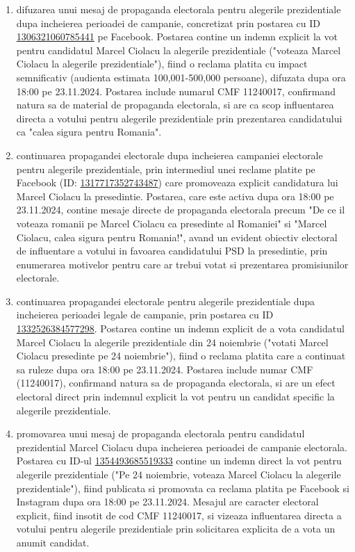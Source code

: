 \documentclass[a4paper,12pt]{article}
\begin{document}
\begin{enumerate}[leftmargin=*, label=\arabic*.)]
    \item difuzarea unui mesaj de propaganda electorala pentru alegerile prezidentiale dupa incheierea perioadei de campanie, concretizat prin postarea cu ID \href{https://www.facebook.com/ads/library/?id=1306321060785441}{1306321060785441} pe Facebook. Postarea contine un indemn explicit la vot pentru candidatul Marcel Ciolacu la alegerile prezidentiale ("voteaza Marcel Ciolacu la alegerile prezidentiale"), fiind o reclama platita cu impact semnificativ (audienta estimata 100,001-500,000 persoane), difuzata dupa ora 18:00 pe 23.11.2024. Postarea include numarul CMF 11240017, confirmand natura sa de material de propaganda electorala, si are ca scop influentarea directa a votului pentru alegerile prezidentiale prin prezentarea candidatului ca "calea sigura pentru Romania".
    \item continuarea propagandei electorale dupa incheierea campaniei electorale pentru alegerile prezidentiale, prin intermediul unei reclame platite pe Facebook (ID: \href{https://www.facebook.com/ads/library/?id=1317717352743487}{1317717352743487}) care promoveaza explicit candidatura lui Marcel Ciolacu la presedintie. Postarea, care este activa dupa ora 18:00 pe 23.11.2024, contine mesaje directe de propaganda electorala precum "De ce il voteaza romanii pe Marcel Ciolacu ca presedinte al Romaniei" si "Marcel Ciolacu, calea sigura pentru Romania!", avand un evident obiectiv electoral de influentare a votului in favoarea candidatului PSD la presedintie, prin enumerarea motivelor pentru care ar trebui votat si prezentarea promisiunilor electorale.
    \item continuarea propagandei electorale pentru alegerile prezidentiale dupa incheierea perioadei legale de campanie, prin postarea cu ID \href{https://www.facebook.com/ads/library/?id=1332526384577298}{1332526384577298}. Postarea contine un indemn explicit de a vota candidatul Marcel Ciolacu la alegerile prezidentiale din 24 noiembrie ("votati Marcel Ciolacu presedinte pe 24 noiembrie"), fiind o reclama platita care a continuat sa ruleze dupa ora 18:00 pe 23.11.2024. Postarea include numar CMF (11240017), confirmand natura sa de propaganda electorala, si are un efect electoral direct prin indemnul explicit la vot pentru un candidat specific la alegerile prezidentiale.
    \item promovarea unui mesaj de propaganda electorala pentru candidatul prezidential Marcel Ciolacu dupa incheierea perioadei de campanie electorala. Postarea cu ID-ul \href{https://www.facebook.com/ads/library/?id=1354493685519333}{1354493685519333} contine un indemn direct la vot pentru alegerile prezidentiale ("Pe 24 noiembrie, voteaza Marcel Ciolacu la alegerile prezidentiale"), fiind publicata si promovata ca reclama platita pe Facebook si Instagram dupa ora 18:00 pe 23.11.2024. Mesajul are caracter electoral explicit, fiind insotit de cod CMF 11240017, si vizeaza influentarea directa a votului pentru alegerile prezidentiale prin solicitarea explicita de a vota un anumit candidat.

\end{enumerate}
\end{document}
